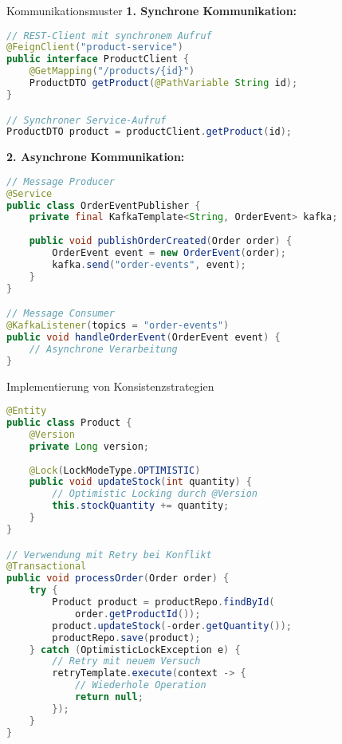 \begin{concept}{Kommunikationsmuster}
\textbf{1. Synchrone Kommunikation:}
\begin{lstlisting}[language=Java]
// REST-Client mit synchronem Aufruf
@FeignClient("product-service")
public interface ProductClient {
    @GetMapping("/products/{id}")
    ProductDTO getProduct(@PathVariable String id);
}

// Synchroner Service-Aufruf
ProductDTO product = productClient.getProduct(id);
\end{lstlisting}

\textbf{2. Asynchrone Kommunikation:}
\begin{lstlisting}[language=Java]
// Message Producer
@Service
public class OrderEventPublisher {
    private final KafkaTemplate<String, OrderEvent> kafka;
    
    public void publishOrderCreated(Order order) {
        OrderEvent event = new OrderEvent(order);
        kafka.send("order-events", event);
    }
}

// Message Consumer
@KafkaListener(topics = "order-events")
public void handleOrderEvent(OrderEvent event) {
    // Asynchrone Verarbeitung
}
\end{lstlisting}
\end{concept}

\begin{example}{Implementierung von Konsistenzstrategien}
\begin{lstlisting}[language=Java]
@Entity
public class Product {
    @Version
    private Long version;
    
    @Lock(LockModeType.OPTIMISTIC)
    public void updateStock(int quantity) {
        // Optimistic Locking durch @Version
        this.stockQuantity += quantity;
    }
}

// Verwendung mit Retry bei Konflikt
@Transactional
public void processOrder(Order order) {
    try {
        Product product = productRepo.findById(
            order.getProductId());
        product.updateStock(-order.getQuantity());
        productRepo.save(product);
    } catch (OptimisticLockException e) {
        // Retry mit neuem Versuch
        retryTemplate.execute(context -> {
            // Wiederhole Operation
            return null;
        });
    }
}
\end{lstlisting}
\end{example}

